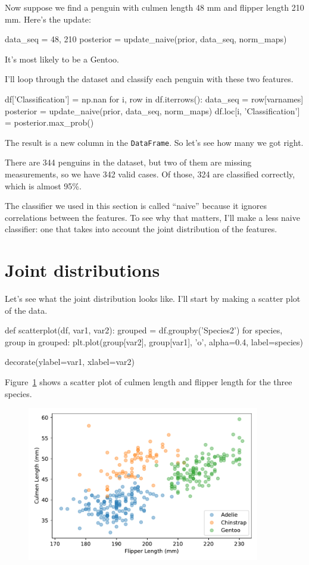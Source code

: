 \documentclass[12pt]{book}
\theoremstyle{exercise}
\newcommand{\py}[1]{{\tt #1}}%
\begin{document}
Now suppose we find a penguin with culmen length 48 mm and flipper
length 210 mm. Here's the update:

\begin{code}
data_seq = 48, 210
posterior = update_naive(prior, data_seq, norm_maps)
\end{code}

It's most likely to be a Gentoo.

I'll loop through the dataset and classify each penguin with these two
features.

\begin{code}
df['Classification'] = np.nan
for i, row in df.iterrows():
    data_seq = row[varnames]
    posterior = update_naive(prior, data_seq, norm_maps)
    df.loc[i, 'Classification'] = posterior.max_prob()
\end{code}

The result is a new column in the \py{DataFrame}.
So let's see how many we got right.

There are 344 penguins in the dataset, but two of them are missing
measurements, so we have 342 valid cases.
Of those, 324 are classified correctly, which is almost 95\%.

The classifier we used in this section is called ``naive'' because it
ignores correlations between the features. To see why that matters, I'll
make a less naive classifier: one that takes into account the joint
distribution of the features.

\section{Joint distributions}
\label{joint-distributions}

Let's see what the joint distribution looks like.
I'll start by making a scatter plot of the data.

\begin{code}
def scatterplot(df, var1, var2):
    grouped = df.groupby('Species2')
    for species, group in grouped:
        plt.plot(group[var2], group[var1], 'o',
                 alpha=0.4, label=species)

    decorate(ylabel=var1, xlabel=var2)
\end{code}

Figure~\ref{fig01-02} shows a scatter plot of culmen length and flipper length for the three
species.

\begin{figure}
\centerline{\includegraphics[width=4in]{figs/fig10-02.pdf}}
\caption{}
\label{fig01-02}
\end{figure}
\end{document}
